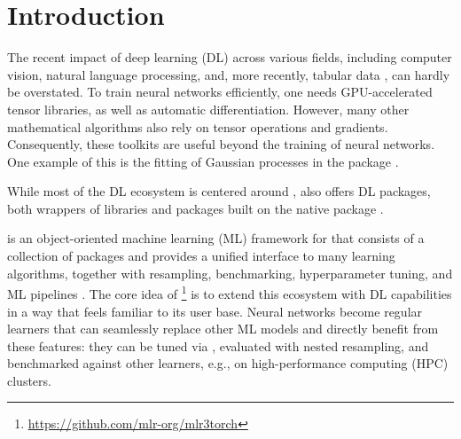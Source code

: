 \documentclass[article,shortnames]{jss}
\theoremstyle{definition}
\begin{document}
%
%

\section{Introduction}

The recent impact of deep learning (DL) across various fields, including computer vision, natural language processing, and, more recently, tabular data \citep{ref-hollmann2025tabpfn, ref-erickson2025tabarena}, can hardly be overstated.
To train neural networks efficiently, one needs GPU-accelerated tensor libraries, as well as automatic differentiation.
However, many other mathematical algorithms also rely on tensor operations and gradients. Consequently, these toolkits are useful beyond the training of neural networks. One example of this is the fitting of Gaussian processes in the  package \citep{gardner2018gpytorch}.

While most of the DL ecosystem is centered around \python{}, \rlang{} \citep{ref-R-base} also offers DL packages, both wrappers of \python{} libraries and packages built on the native \torch{} package \citep{ref-torch2025}.

\mlrt{} \citep{ref-mlr32019} is an object-oriented machine learning (ML) framework for \rlang{} that consists of a collection of packages and provides a unified interface to many learning algorithms, together with resampling, benchmarking, hyperparameter tuning, and ML pipelines \citep{ref-mlr3pipelines2021}.
The core idea of \mlrttorch{}\footnote{\url{https://github.com/mlr-org/mlr3torch}} is to extend this ecosystem with DL capabilities in a way that feels familiar to its user base.
Neural networks become regular \mlrt{} learners that can seamlessly replace other ML models and directly benefit from these features: they can be tuned via  \citep{ref-mlr3tuning2024}, evaluated with nested resampling, and benchmarked against other learners, e.g., on high-performance computing (HPC) clusters.
\end{document}
